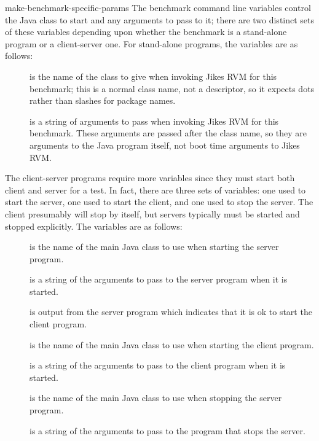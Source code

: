 \begin{description}
\begin{Label}{make-benchmark-specific-params}
 The benchmark command line variables control the Java class to start
and any arguments to pass to it; there are two distinct sets of these
variables depending upon whether the benchmark is a stand-alone program
or a client-server one.  For stand-alone programs, the variables are as
follows: 
\begin{description}
\item[] is the name of the class to give when invoking
Jikes RVM
for this benchmark; this is a normal class name, not a descriptor, so
it expects dots rather than slashes for package names.
\item[] is a string of arguments to pass when invoking
Jikes RVM
for this benchmark.  These arguments are passed after the class name,
so they are arguments to the Java program itself, not boot time
arguments to Jikes RVM.\@
\end{description}

 The client-server programs require more variables since they must
start both client and server for a test.  In fact, there are three
sets of variables: one used to start the server, one used to start the
client, and one used to stop the server.  The client presumably will
stop by itself, but servers typically must be started and stopped
explicitly.  The variables are as follows:
\begin{description}
\item[] is the name of the main Java class to use when
starting the server program.
\item[] is a string of the arguments to pass to the server
program when it is started.
\item[] is output from the server program which indicates that
it is ok to start the client program.
\item[] is the name of the main Java class to use when
starting the client program.
\item[] is a string of the arguments to pass to the client
program when it is started.
\item[] is the name of the main Java class to use when
stopping the server program.
\item[] is a string of the arguments to pass to the program
that stops the server.
\end{description}
\end{Label}


\end{description}
